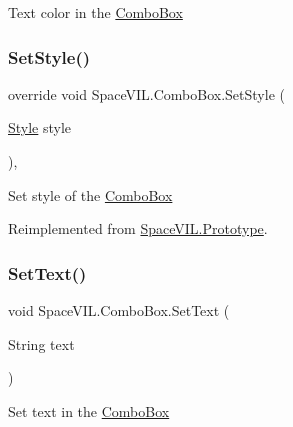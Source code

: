 Text color in the \mbox{\hyperlink{class_space_v_i_l_1_1_combo_box}{Combo\+Box}} 

\mbox{\label{class_space_v_i_l_1_1_combo_box_a5aaf1e459ca198f19c8bc4805f5f3b10}} 
\subsubsection{\texorpdfstring{Set\+Style()}{SetStyle()}}
{\footnotesize\ttfamily override void Space\+V\+I\+L.\+Combo\+Box.\+Set\+Style (\begin{DoxyParamCaption}\item[{\mbox{\hyperlink{class_space_v_i_l_1_1_decorations_1_1_style}{Style}}}]{style }\end{DoxyParamCaption})\hspace{0.3cm}{\ttfamily [inline]}, {\ttfamily [virtual]}}



Set style of the \mbox{\hyperlink{class_space_v_i_l_1_1_combo_box}{Combo\+Box}} 



Reimplemented from \mbox{\hyperlink{class_space_v_i_l_1_1_prototype_ae96644a6ace490afb376fb542161e541}{Space\+V\+I\+L.\+Prototype}}.

\mbox{\label{class_space_v_i_l_1_1_combo_box_a9a72026c1c366df889b2f8829e965b98}} 
\subsubsection{\texorpdfstring{Set\+Text()}{SetText()}}
{\footnotesize\ttfamily void Space\+V\+I\+L.\+Combo\+Box.\+Set\+Text (\begin{DoxyParamCaption}\item[{String}]{text }\end{DoxyParamCaption})\hspace{0.3cm}{\ttfamily [inline]}}



Set text in the \mbox{\hyperlink{class_space_v_i_l_1_1_combo_box}{Combo\+Box}} 

